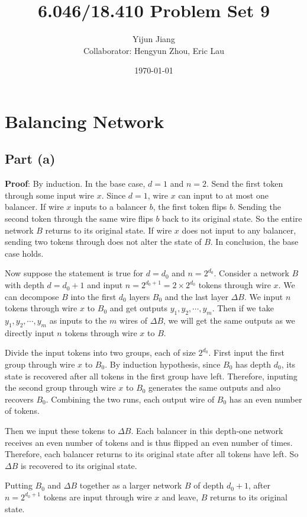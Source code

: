 \documentclass{article}
\title{6.046/18.410 Problem Set 9}
\author{Yijun Jiang\vspace{3pt}\\Collaborator: Hengyun Zhou, Eric Lau}
\date{\today}
\begin{document}
\maketitle

\section{Balancing Network}
\subsection{Part (a)}
\noindent\textbf{Proof}:
By induction. In the base case, $d=1$ and $n=2$. Send the first token through some input wire $x$. Since $d=1$, wire $x$ can input to at most one balancer. If wire $x$ inputs to a balancer $b$, the first token flips $b$. Sending the second token through the same wire flips $b$ back to its original state. So the entire network $B$ returns to its original state. If wire $x$ does not input to any balancer, sending two tokens through does not alter the state of $B$. In conclusion, the base case holds.

Now suppose the statement is true for $d=d_0$ and $n=2^{d_0}$. Consider a network $B$ with depth $d=d_0+1$ and input $n=2^{d_0+1}=2\times 2^{d_0}$ tokens through wire $x$. We can decompose $B$ into the first $d_0$ layers $B_0$ and the last layer $\Delta B$. We input $n$ tokens through wire $x$ to $B_0$ and get outputs $y_1,y_2,\cdots,y_m$. Then if we take $y_1,y_2,\cdots,y_m$ as inputs to the $m$ wires of $\Delta B$, we will get the same outputs as we directly input $n$ tokens through wire $x$ to $B$.

Divide the input tokens into two groups, each of size $2^{d_0}$. First input the first group through wire $x$ to $B_0$. By induction hypothesis, since $B_0$ has depth $d_0$, its state is recovered after all tokens in the first group have left. Therefore, inputing the second group through wire $x$ to $B_0$ generates the same outputs and also recovers $B_0$. Combining the two runs, each output wire of $B_0$ has an even number of tokens.

Then we input these tokens to $\Delta B$. Each balancer in this depth-one network receives an even number of tokens and is thus flipped an even number of times. Therefore, each balancer returns to its original state after all tokens have left. So $\Delta B$ is recovered to its original state.

Putting $B_0$ and $\Delta B$ together as a larger network $B$ of depth $d_0+1$, after $n=2^{d_0+1}$ tokens are input through wire $x$ and leave, $B$ returns to its original state.
\end{document}
